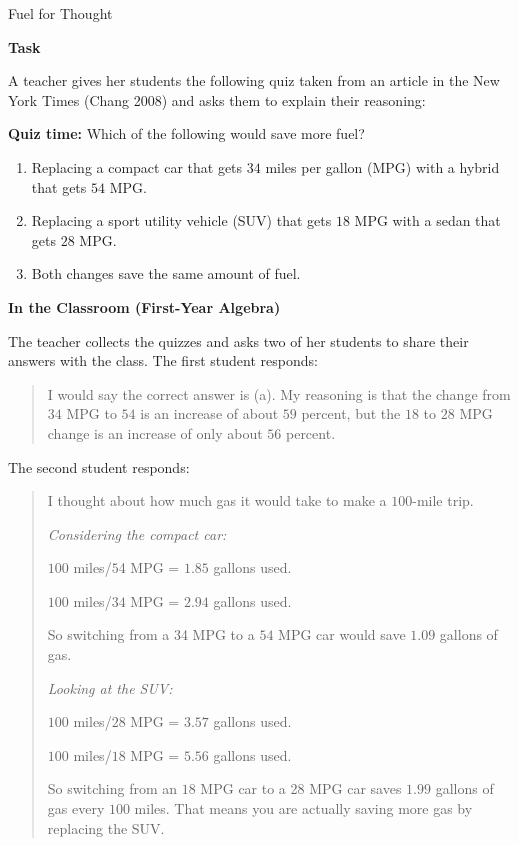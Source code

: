 \documentclass[
  10pt,
  a4paper,
  landscape,
  twoside,
  openany
]{scrbook}
\begin{document}
\TriExample
{Fuel for Thought}
{
\noindent
\textbf{Task}

A teacher gives her students the following quiz taken from an article in the New York Times (Chang 2008) and asks them to explain their reasoning:

\textbf{Quiz time:} Which of the following would save more fuel?

\begin{enumerate}
  \item [(a)] Replacing a compact car that gets $34$ miles per gallon (MPG) with a hybrid that gets $54$ MPG.
  \item [(b)] Replacing a sport utility vehicle (SUV) that gets $18$ MPG with a sedan that gets $28$ MPG.
  \item [(c)] Both changes save the same amount of fuel.
\end{enumerate}

\noindent
\textbf{In the Classroom (First-Year Algebra)}

The teacher collects the quizzes and asks two of her students to share their answers with the class. The first student responds:

\begin{quote}
  I would say the correct answer is (a). My reasoning is that the change from $34$ MPG to $54$ is an increase of about $59$ percent, but the $18$ to $28$ MPG change is an increase of only about $56$ percent.
\end{quote}

The second student responds:

\begin{quote}
  I thought about how much gas it would take to make a $100$-mile trip.

  \emph{Considering the compact car:}

  $100$ miles/$5$4 MPG = $1.85$ gallons used.

  $100$ miles/$34$ MPG = $2.94$ gallons used.

  So switching from a $3$4 MPG to a $54$ MPG car would save $1.09$ gallons of gas.

  \emph{Looking at the SUV:}

  $100$ miles/$28$ MPG = $3.57$ gallons used.

  $100$ miles/$18$ MPG = $5.56$ gallons used.

  So switching from an $18$ MPG car to a 28 MPG car saves $1.99$ gallons of gas every $100$ miles. That means you are actually saving more gas by replacing the SUV.
\end{quote}

}
\end{document}
